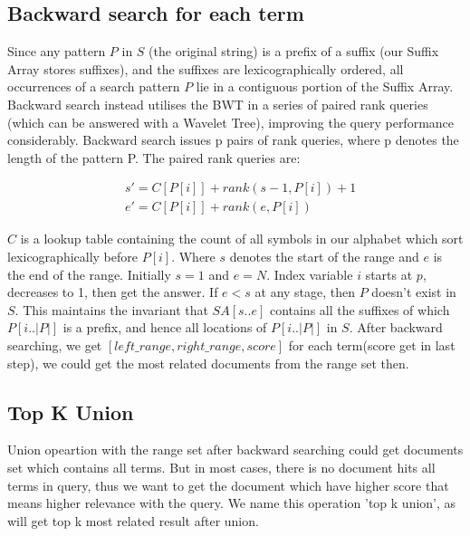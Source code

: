 \subsection{Backward search for each term}

Since any pattern \(P\) in \(S\) (the original string) is a prefix of a suffix (our Suffix Array stores suffixes), and the suffixes are lexicographically ordered, all occurrences of a search pattern \(P\) lie in a contiguous portion of the Suffix Array.
Backward search instead utilises the BWT in a series of paired rank queries (which can be answered with a Wavelet Tree), improving the query performance considerably. Backward search issues p pairs of rank queries, where p denotes the length of the pattern P. The paired rank queries are:

\begin{equation}
  \label{ex:equation_bs}
  \begin{aligned}
    &s' = C[P[i]] + rank(s {-} 1, P[i]) + 1 \\
    &e' = C[P[i]] + rank(e, P[i])
  \end{aligned}
\end{equation}

\(C\) is a lookup table containing the count of all symbols in our alphabet which sort lexicographically before \(P[i]\).
Where \(s\) denotes the start of the range and \(e\) is the end of the range. Initially \(s=1\) and \(e=N\). Index variable \(i\) starts at \(p\), decreases to 1, then get the answer. If \(e<s\) at any stage, then \(P\) doesn’t exist in \(S\). This maintains the invariant that \(SA[s..e]\) contains all the suffixes of which \(P[i..|P|]\) is a prefix, and hence all locations of \(P[i..|P|]\) in \(S\).
After backward searching, we get \([left\_range, right\_range, score]\) for each term(score get in last step), we could get the most related documents from the range set then.

\subsection{Top K Union}

Union opeartion with the range set after backward searching could get documents set which contains all terms. But in most cases, there is no document hits all terms in query, thus we want to get the document which have higher score that means higher relevance with the query. We name this operation 'top k union', as will get top k most related result after union.

